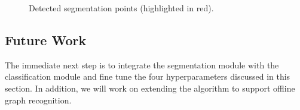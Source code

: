\begin{figure}
\begin{subfigure}{0.8\textwidth}
	\end{subfigure}
	\caption{Detected segmentation points (highlighted in red).}
	\label{fig:seg_results}
\end{figure}

\subsection{Future Work}
The immediate next step is to integrate the segmentation module with the classification module and fine tune the four hyperparameters discussed in this section. In addition, we will work on extending the algorithm to support offline graph recognition.